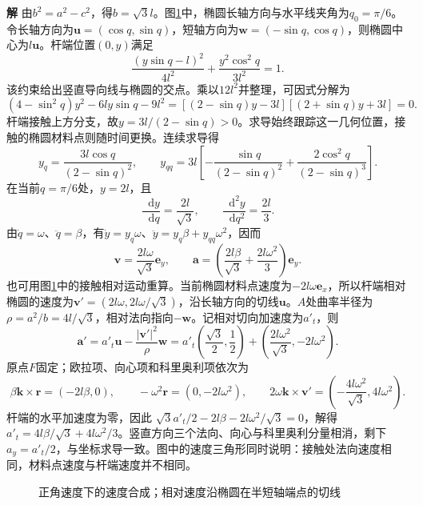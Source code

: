 \documentclass[11pt,openany,fontset=fandol]{ctexbook}
\theoremstyle{definition}\newtheorem{example}{例}[chapter]\newtheorem{exercise}{习题}[chapter]
\newcommand{\SolutionStart}{\par\medskip\ifdim\pagetotal>0pt\ifdim\dimexpr\pagegoal-\pagetotal\relax<3\baselineskip\newpage\fi\fi\noindent\textbf{解}\quad\ignorespaces}
\newenvironment{solution}{\SolutionStart}{\par\medskip}
\newcommand{\dd}{\mathop{}\!\mathrm d}\newcommand{\ee}{\mathrm e}\newcommand{\vct}[1]{\bm{#1}}
\begin{document}
\begin{solution}
由$b^2=a^2-c^2$，得$b=\sqrt3l$。图\ref{mp3:fig:hw:l3-20-s}中，椭圆长轴方向与水平线夹角为$q_0=\pi/6$。令长轴方向为$\vct u=(\cos q,\sin q)$，短轴方向为$\vct w=(-\sin q,\cos q)$，则椭圆中心为$l\vct u$。杆端位置$(0,y)$满足
\[
 \frac{(y\sin q-l)^2}{4l^2}
 +\frac{y^2\cos^2q}{3l^2}=1.
\]
该约束给出竖直导向线与椭圆的交点。乘以$12l^2$并整理，可因式分解为
\[
(4-\sin^2q)y^2-6ly\sin q-9l^2
=[(2-\sin q)y-3l][(2+\sin q)y+3l]=0.
\]
杆端接触上方分支，故$y=3l/(2-\sin q)>0$。求导始终跟踪这一几何位置，接触的椭圆材料点则随时间更换。连续求导得
\[
y_q=\frac{3l\cos q}{(2-\sin q)^2},\qquad
y_{qq}=3l\left[-\frac{\sin q}{(2-\sin q)^2}
+\frac{2\cos^2q}{(2-\sin q)^3}\right].
\]
在当前$q=\pi/6$处，$y=2l$，且
\[
 \frac{\dd y}{\dd q}=\frac{2l}{\sqrt3},\qquad
 \frac{\dd^2y}{\dd q^2}=\frac{2l}{3}.
\]
由$\dot q=\omega$、$\ddot q=\beta$，有$\dot y=y_q\omega$、$\ddot y=y_q\beta+y_{qq}\omega^2$，因而
\[
 \boxed{\vct v=\frac{2l\omega}{\sqrt3}\vct e_y},\qquad
 \boxed{\vct a=\left(\frac{2l\beta}{\sqrt3}
                         +\frac{2l\omega^2}{3}\right)\vct e_y}.
\]
也可用图\ref{mp3:fig:hw:l3-20-s}中的接触相对运动重算。当前椭圆材料点速度为$-2l\omega\vct e_x$，所以杆端相对椭圆的速度为$\vct v'=(2l\omega,2l\omega/\sqrt3)$，沿长轴方向的切线$\vct u$。$A$处曲率半径为$\rho=a^2/b=4l/\sqrt3$，相对法向指向$-\vct w$。记相对切向加速度为$a'_t$，则
\[
\vct a'=a'_t\vct u-\frac{|\vct v'|^2}{\rho}\vct w
=a'_t\left(\frac{\sqrt3}{2},\frac12\right)
+\left(\frac{2l\omega^2}{\sqrt3},-2l\omega^2\right).
\]
原点$F$固定；欧拉项、向心项和科里奥利项依次为
\[
\beta\vct k\times\vct r=(-2l\beta,0),\qquad
-\omega^2\vct r=(0,-2l\omega^2),\qquad
2\omega\vct k\times\vct v'
=\left(-\frac{4l\omega^2}{\sqrt3},4l\omega^2\right).
\]
杆端的水平加速度为零，因此
$\sqrt3a'_t/2-2l\beta-2l\omega^2/\sqrt3=0$，解得
$a'_t=4l\beta/\sqrt3+4l\omega^2/3$。竖直方向三个法向、向心与科里奥利分量相消，剩下$a_y=a'_t/2$，与坐标求导一致。图中的速度三角形同时说明：接触处法向速度相同，材料点速度与杆端速度并不相同。


\begin{figure}[H]\centering
{}
\caption{正角速度下的速度合成；相对速度沿椭圆在半短轴端点的切线}\label{mp3:fig:hw:l3-20-s}
\end{figure}

\end{solution}
\end{document}
